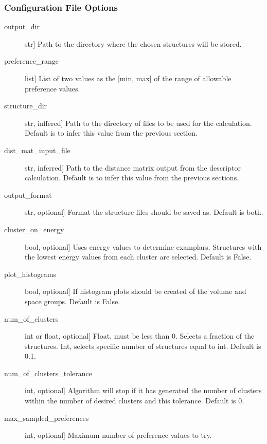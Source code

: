 \documentclass[letterpaper,10pt,english]{sphinxmanual}
\begin{document}
\begin{fulllineitems}
\begin{fulllineitems}
\subsubsection*{Configuration File Options}
\begin{description}
\item[{output\_dir}] \leavevmode{[}str{]}
Path to the directory where the chosen structures will be stored.

\item[{preference\_range}] \leavevmode{[}list{]}
List of two values as the {[}min, max{]} of the range of allowable
preference values.

\item[{structure\_dir}] \leavevmode{[}str, inffered{]}
Path to the directory of files to be used for the calculation.
Default is to infer this value from the previous section.

\item[{dist\_mat\_input\_file}] \leavevmode{[}str, inferred{]}
Path to the distance matrix output from the descriptor calculation.
Default is to infer this value from the previous sections.

\item[{output\_format}] \leavevmode{[}str, optional{]}
Format the structure files should be saved as. Default is both.

\item[{cluster\_on\_energy}] \leavevmode{[}bool, optional{]}
Uses energy values to determine examplars. Structures with the
lowest energy values from each cluster are selected.
Default is False.

\item[{plot\_histograms}] \leavevmode{[}bool, optional{]}
If histogram plots should be created of the volume and space
groups. Default is False.

\item[{num\_of\_clusters}] \leavevmode{[}int or float, optional{]}
Float, must be less than 0. Selects a fraction of the structures.
Int, selects specific number of structures equal to int.
Default is 0.1.

\item[{num\_of\_clusters\_tolerance}] \leavevmode{[}int, optional{]}
Algorithm will stop if it has generated the number of clusters
within the number of desired clusters and this tolerance.
Default is 0.

\item[{max\_sampled\_preferences}] \leavevmode{[}int, optional{]}
Maximum number of preference values to try.


\end{description}
\end{fulllineitems}
\end{fulllineitems}
\end{document}
